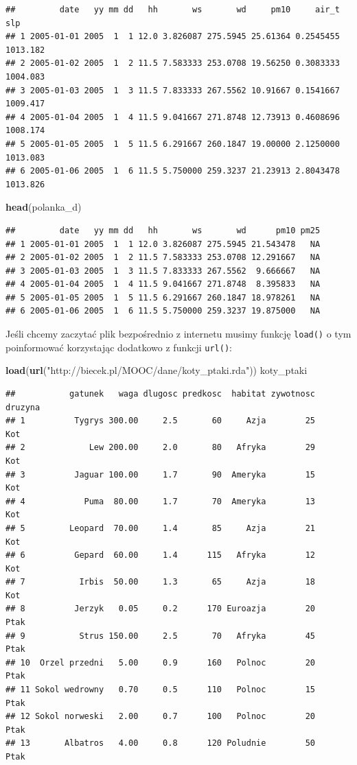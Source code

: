 \documentclass[]{book}
\newenvironment{Shaded}{\begin{snugshade}}{\end{snugshade}}
\newcommand{\KeywordTok}[1]{\textcolor[rgb]{0.13,0.29,0.53}{\textbf{#1}}}
\newcommand{\StringTok}[1]{\textcolor[rgb]{0.31,0.60,0.02}{#1}}
\newcommand{\NormalTok}[1]{#1}
\theoremstyle{definition}
\theoremstyle{definition}
\theoremstyle{definition}
\theoremstyle{remark}
\begin{document}
\begin{verbatim}
##         date   yy mm dd   hh       ws       wd     pm10     air_t      slp
## 1 2005-01-01 2005  1  1 12.0 3.826087 275.5945 25.61364 0.2545455 1013.182
## 2 2005-01-02 2005  1  2 11.5 7.583333 253.0708 19.56250 0.3083333 1004.083
## 3 2005-01-03 2005  1  3 11.5 7.833333 267.5562 10.91667 0.1541667 1009.417
## 4 2005-01-04 2005  1  4 11.5 9.041667 271.8748 12.73913 0.4608696 1008.174
## 5 2005-01-05 2005  1  5 11.5 6.291667 260.1847 19.00000 2.1250000 1013.083
## 6 2005-01-06 2005  1  6 11.5 5.750000 259.3237 21.23913 2.8043478 1013.826
\end{verbatim}

\begin{Shaded}
\begin{Highlighting}[]
\KeywordTok{head}\NormalTok{(polanka_d)}
\end{Highlighting}
\end{Shaded}

\begin{verbatim}
##         date   yy mm dd   hh       ws       wd      pm10 pm25
## 1 2005-01-01 2005  1  1 12.0 3.826087 275.5945 21.543478   NA
## 2 2005-01-02 2005  1  2 11.5 7.583333 253.0708 12.291667   NA
## 3 2005-01-03 2005  1  3 11.5 7.833333 267.5562  9.666667   NA
## 4 2005-01-04 2005  1  4 11.5 9.041667 271.8748  8.395833   NA
## 5 2005-01-05 2005  1  5 11.5 6.291667 260.1847 18.978261   NA
## 6 2005-01-06 2005  1  6 11.5 5.750000 259.3237 19.875000   NA
\end{verbatim}

Jeśli chcemy zaczytać plik bezpośrednio z internetu musimy funkcję
\texttt{load()} o tym poinformować korzystając dodatkowo z funkcji
\texttt{url()}:

\begin{Shaded}
\begin{Highlighting}[]
\KeywordTok{load}\NormalTok{(}\KeywordTok{url}\NormalTok{(}\StringTok{"http://biecek.pl/MOOC/dane/koty_ptaki.rda"}\NormalTok{))}
\NormalTok{koty_ptaki}
\end{Highlighting}
\end{Shaded}

\begin{verbatim}
##           gatunek   waga dlugosc predkosc  habitat zywotnosc druzyna
## 1          Tygrys 300.00     2.5       60     Azja        25     Kot
## 2             Lew 200.00     2.0       80   Afryka        29     Kot
## 3          Jaguar 100.00     1.7       90  Ameryka        15     Kot
## 4            Puma  80.00     1.7       70  Ameryka        13     Kot
## 5         Leopard  70.00     1.4       85     Azja        21     Kot
## 6          Gepard  60.00     1.4      115   Afryka        12     Kot
## 7           Irbis  50.00     1.3       65     Azja        18     Kot
## 8          Jerzyk   0.05     0.2      170 Euroazja        20    Ptak
## 9           Strus 150.00     2.5       70   Afryka        45    Ptak
## 10  Orzel przedni   5.00     0.9      160   Polnoc        20    Ptak
## 11 Sokol wedrowny   0.70     0.5      110   Polnoc        15    Ptak
## 12 Sokol norweski   2.00     0.7      100   Polnoc        20    Ptak
## 13       Albatros   4.00     0.8      120 Poludnie        50    Ptak
\end{verbatim}
\end{document}

